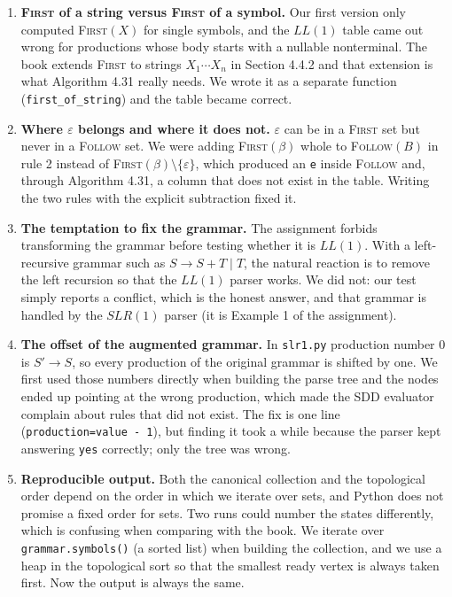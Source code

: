 \documentclass[11pt]{article}
\newcommand{\first}{\textsc{First}}
\newcommand{\follow}{\textsc{Follow}}
\begin{document}
\begin{enumerate}
  \item \textbf{\first{} of a string versus \first{} of a symbol.} Our first version
        only computed \first{}$(X)$ for single symbols, and the $LL(1)$ table came out
        wrong for productions whose body starts with a nullable nonterminal. The book
        extends \first{} to strings $X_1\cdots X_n$ in Section 4.4.2 and that extension
        is what Algorithm 4.31 really needs. We wrote it as a separate function
        (\texttt{first\_of\_string}) and the table became correct.

  \item \textbf{Where $\varepsilon$ belongs and where it does not.} $\varepsilon$ can be
        in a \first{} set but never in a \follow{} set. We were adding
        \first{}$(\beta)$ whole to \follow{}$(B)$ in rule 2 instead of
        \first{}$(\beta) \setminus \{\varepsilon\}$, which produced an \texttt{e} inside
        \follow{} and, through Algorithm 4.31, a column that does not exist in the
        table. Writing the two rules with the explicit subtraction fixed it.

  \item \textbf{The temptation to fix the grammar.} The assignment forbids transforming
        the grammar before testing whether it is $LL(1)$. With a left-recursive grammar
        such as $S \rightarrow S{+}T \mid T$, the natural reaction is to remove the left
        recursion so that the $LL(1)$ parser works. We did not: our test simply reports a
        conflict, which is the honest answer, and that grammar is handled by the
        $SLR(1)$ parser (it is Example 1 of the assignment).

  \item \textbf{The offset of the augmented grammar.} In \texttt{slr1.py} production
        number $0$ is $S' \rightarrow S$, so every production of the original grammar is
        shifted by one. We first used those numbers directly when building the parse
        tree and the nodes ended up pointing at the wrong production, which made the SDD
        evaluator complain about rules that did not exist. The fix is one line
        (\verb|production=value - 1|), but finding it took a while because the parser
        kept answering \texttt{yes} correctly; only the tree was wrong.

  \item \textbf{Reproducible output.} Both the canonical collection and the topological
        order depend on the order in which we iterate over sets, and Python does not
        promise a fixed order for sets. Two runs could number the states differently,
        which is confusing when comparing with the book. We iterate over
        \texttt{grammar.symbols()} (a sorted list) when building the collection, and we
        use a heap in the topological sort so that the smallest ready vertex is always
        taken first. Now the output is always the same.


\end{enumerate}
\end{document}
